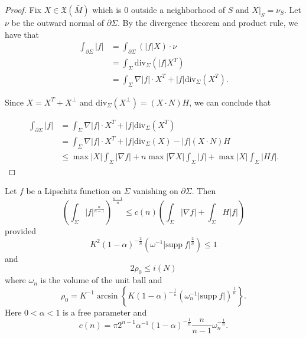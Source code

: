 \begin{proof}
    Fix $X \in \mathfrak{X} (\bar{M})$ which is 0 outside a neighborhood of $S$ and $X|_S=\nu _S$. Let $\nu$ be the outward normal of $\partial \Sigma $. By the divergence theorem and product rule, we have that
    \begin{equation*}
    \begin{split}
        \int_{\partial \Sigma} \left| f \right| 
        & = \int_{\partial \Sigma} \left(\left| f \right| X \right) \cdot \nu \\
    &=  \int_{\Sigma} \mathrm{div}  _{\Sigma } \left( \left| f \right| X^T \right)  \\
    &= \int_{\Sigma} \nabla \left| f \right| \cdot X^T + \left| f \right| \mathrm{div}  _{\Sigma } (X^T).
    \end{split}
    \end{equation*}

    Since $X=X^T+X^\bot $ and $\mathrm{div}_{\Sigma }(X^\bot)=(X \cdot N)H $, we can conclude that

    \begin{equation*}
        \begin{split}
            \int_{\partial \Sigma} \left| f \right| 
        &= \int_{\Sigma} \nabla \left| f \right| \cdot X^T + \left| f \right| \mathrm{div}  _{\Sigma } (X^T)\\
        &= \int_{\Sigma} \nabla \left| f \right| \cdot X^T + \left| f \right| \mathrm{div}  _{\Sigma } (X) - \left| f \right| \left(X \cdot N \right)H\\
        &\leq \max \left| X \right| \int_{\Sigma} \left| \nabla f \right| + n \max \left| \nabla X \right| \int_{\Sigma} \left| f \right| + \max \left| X \right| \int_{\Sigma} \left| Hf \right| .
        \end{split}
        \end{equation*} 
\end{proof}

\begin{lemma} \label{MSRie}
    Let $f$ be a Lipschitz function on $\Sigma $ vanishing on $\partial \Sigma $. Then
    \[\left( \int_{\Sigma }^{}\left| f \right| ^{\frac{n}{n-1}} \right) ^{\frac{n-1}{n}}\leq c(n)\left( \int_{\Sigma} \left| \nabla f \right| + \int_{\Sigma} H \left| f \right|  \right) \]
    provided
    \[K^2(1-\alpha )^{-\frac{2}{n}}(\omega^{-1}\left| \mathrm{supp} \ f \right| ^{\frac{2}{n}}) \leq 1\]
    and
    \[2 \rho _0 \leq i(N)\]
    where $\omega_n$ is the volume of the unit ball and
    \[\rho_0=K^{-1}\arcsin \left\{ K(1-\alpha )^{-\frac{1}{n}}\left( \omega _n^{-1}\left|\mathrm{supp}\ f  \right|  \right) ^{\frac{1}{n}} \right\}. \]
    Here $0<\alpha<1 $ is a free parameter and
    \[c(n)=\pi 2^{n-1}\alpha ^{-1}\left( 1-\alpha  \right) ^{-\frac{1}{n}} \frac{n}{n-1} \omega _n^{-\frac{1}{n}}.\]
\end{lemma}

